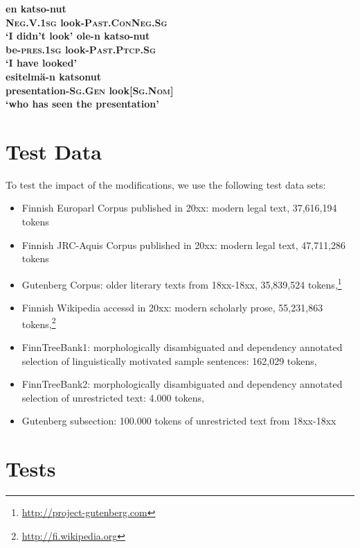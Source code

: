 \documentclass[11pt]{article}
\begin{document}
\begin{exe}
    \ex \label{gloss:pcp-conneg}
    \gll \bf en \bf katso-nut \\
    \small \textsc{Neg.V.1sg} \small look-\textsc{Past.ConNeg.Sg} \\
    \glt `I didn't look'
    \ex \label{gloss:pcp-past}
    \gll \bf ole-n \bf katso-nut \\
    \small be-\textsc{pres.1sg} \small look-\textsc{Past.Ptcp.Sg} \\
    \glt `I have looked' \\
    \ex \label{gloss:pcp-drv}
    \gll \bf esitelmä-n \bf katsonut \\
    \small presentation-\textsc{Sg.Gen} \small look[\textsc{Sg.Nom}] \\
    \glt `who has seen the presentation'
\end{exe}

\section{Test Data}

To test the impact of the modifications, we use the following test data sets:

\begin{itemize}
\item Finnish Europarl Corpus published in 20xx: modern legal text, 37,616,194 tokens \cite{koehn2005europarl}
\item Finnish JRC-Aquis Corpus published in 20xx: modern legal text, 47,711,286 tokens \cite{steinberger2006jrc}
\item Gutenberg Corpus: older literary texts from 18xx-18xx, 35,839,524 tokens,\footnote{\url{http://project-gutenberg.com}}
\item Finnish Wikipedia accessd in 20xx: modern scholarly prose, 55,231,863 tokens,\footnote{\url{http://fi.wikipedia.org}}
\item FinnTreeBank1: morphologically disambiguated and dependency annotated selection of linguistically motivated sample sentences: 
         162,029 tokens, 
\item FinnTreeBank2: morphologically disambiguated and dependency annotated selection of unrestricted text: 
         4.000 tokens, \cite{voutilainen2012specifying}
\item Gutenberg subsection: 100.000 tokens of unrestricted text from 18xx-18xx
\end{itemize}

\section{Tests}
\end{document}
